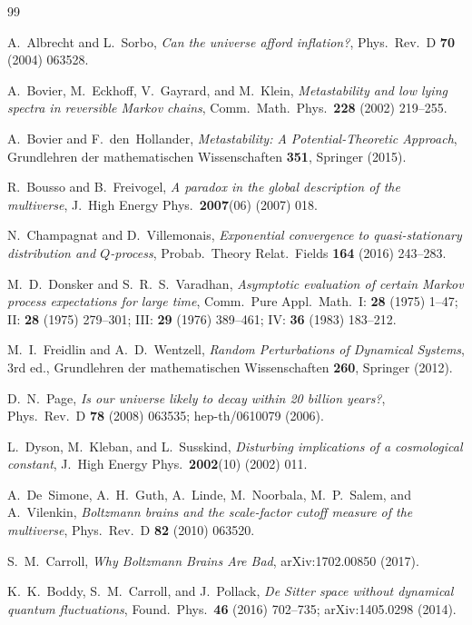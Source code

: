\documentclass[11pt]{article}
\begin{document}
\begin{thebibliography}{99}

A.~Albrecht and L.~Sorbo,
\emph{Can the universe afford inflation?},
Phys.\ Rev.\ D \textbf{70} (2004) 063528.

A.~Bovier, M.~Eckhoff, V.~Gayrard, and M.~Klein,
\emph{Metastability and low lying spectra in reversible Markov chains},
Comm.\ Math.\ Phys.\ \textbf{228} (2002) 219--255.

A.~Bovier and F.~den~Hollander,
\emph{Metastability: A Potential-Theoretic Approach},
Grundlehren der mathematischen Wissenschaften \textbf{351},
Springer (2015).

R.~Bousso and B.~Freivogel,
\emph{A paradox in the global description of the multiverse},
J.\ High Energy Phys.\ \textbf{2007}(06) (2007) 018.

N.~Champagnat and D.~Villemonais,
\emph{Exponential convergence to quasi-stationary distribution
and $Q$-process},
Probab.\ Theory Relat.\ Fields \textbf{164} (2016) 243--283.

M.~D.~Donsker and S.~R.~S.~Varadhan,
\emph{Asymptotic evaluation of certain Markov process expectations
for large time},
Comm.\ Pure Appl.\ Math.\ I: \textbf{28} (1975) 1--47;
II: \textbf{28} (1975) 279--301;
III: \textbf{29} (1976) 389--461;
IV: \textbf{36} (1983) 183--212.

M.~I.~Freidlin and A.~D.~Wentzell,
\emph{Random Perturbations of Dynamical Systems},
3rd ed., Grundlehren der mathematischen Wissenschaften \textbf{260},
Springer (2012).

D.~N.~Page,
\emph{Is our universe likely to decay within 20 billion years?},
Phys.\ Rev.\ D \textbf{78} (2008) 063535;
hep-th/0610079 (2006).

L.~Dyson, M.~Kleban, and L.~Susskind,
\emph{Disturbing implications of a cosmological constant},
J.\ High Energy Phys.\ \textbf{2002}(10) (2002) 011.

A.~De~Simone, A.~H.~Guth, A.~Linde, M.~Noorbala, M.~P.~Salem,
and A.~Vilenkin,
\emph{Boltzmann brains and the scale-factor cutoff measure of the
multiverse},
Phys.\ Rev.\ D \textbf{82} (2010) 063520.

S.~M.~Carroll,
\emph{Why Boltzmann Brains Are Bad},
arXiv:1702.00850 (2017).

K.~K.~Boddy, S.~M.~Carroll, and J.~Pollack,
\emph{De Sitter space without dynamical quantum fluctuations},
Found.\ Phys.\ \textbf{46} (2016) 702--735;
arXiv:1405.0298 (2014).


\end{thebibliography}
\end{document}
